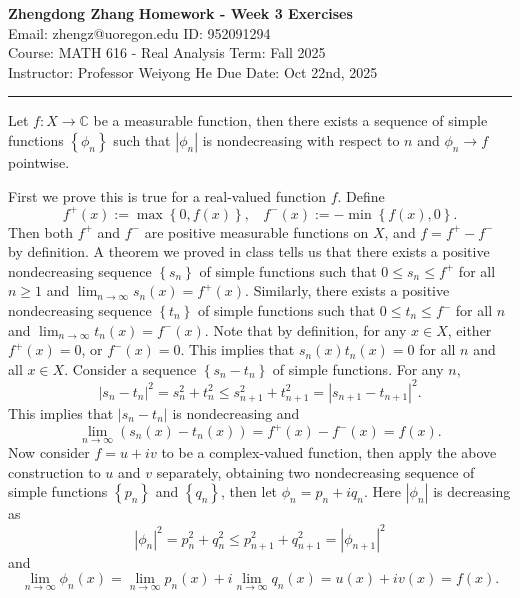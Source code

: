 \documentclass[letterpaper, 12pt]{article}
\begin{document}
\noindent
\large\textbf{Zhengdong Zhang} \hfill \textbf{Homework - Week 3 Exercises}   \\
Email: zhengz@uoregon.edu \hfill ID: 952091294 \\
\normalsize Course: MATH 616 - Real Analysis \hfill Term: Fall 2025 \\
Instructor: Professor Weiyong He \hfill Due Date: Oct 22nd, 2025 \\
\noindent\rule{7in}{2.8pt}
\begin{problem}{3.1}
Let \(f:X\rightarrow \mathbb{C}\) be a measurable function, then there exists a sequence of simple functions \(\left\{ \phi_n \right\}\) such that \(|\phi_n|\) is nondecreasing with respect to \(n\) and \(\phi_n\to f\) pointwise.
\end{problem}
\begin{solution}
First we prove this is true for a real-valued function \(f\). Define 
\[f^+(x):=\max\left\{ 0, f(x)\right\},\ \ \ \ f^-(x):=-\min\left\{ f(x),0 \right\}.\]
Then both \(f^+\) and \(f^-\) are positive measurable functions on \(X\), and \(f=f^+-f^-\) by definition. A theorem we proved in class tells us that there exists a positive nondecreasing sequence \(\left\{ s_n \right\}\) of simple functions such that \(0\leq s_n\leq f^+\) for all \(n\geq 1\) and \(\lim_{n\to \infty}s_n(x)=f^+(x)\). Similarly, there exists a positive nondecreasing sequence \(\left\{ t_n \right\}\) of simple functions such that \(0\leq t_n\leq f^-\) for all \(n\) and \(\lim_{n\to \infty}t_n(x)=f^-(x)\). Note that by definition, for any \(x\in X\), either \(f^+(x)=0\), or \(f^-(x)=0\). This implies that \(s_n(x)t_n(x)=0\) for all \(n\) and all \(x\in X\). Consider a sequence \(\left\{ s_n-t_n \right\}\) of simple functions. For any \(n\), 
\[|s_n-t_n|^2=s_n^2+t_n^2\leq s_{n+1}^2+t_{n+1}^2=|s_{n+1}-t_{n+1}|^2.\]
This implies that \(|s_n-t_n|\) is nondecreasing
and 
\[\lim_{n\to \infty}(s_n(x)-t_n(x))=f^+(x)-f^-(x)=f(x).\]
Now consider \(f=u+iv\) to be a complex-valued function, then apply the above construction to \(u\) and \(v\) separately, obtaining two nondecreasing sequence of simple functions \(\left\{ p_n \right\}\) and \(\left\{ q_n \right\}\), then let \(\phi_n=p_n+iq_n\). Here \(|\phi_n|\) is decreasing as 
\[|\phi_n|^2=p_n^2+q_n^2\leq p_{n+1}^2+q_{n+1}^2=|\phi_{n+1}|^2\]
and 
\[\lim_{n\to \infty} \phi_n(x)=\lim_{n\to \infty}p_n(x)+i\lim_{n\to \infty}q_n(x)=u(x)+iv(x)=f(x).\] 
\end{solution}
\end{document}
